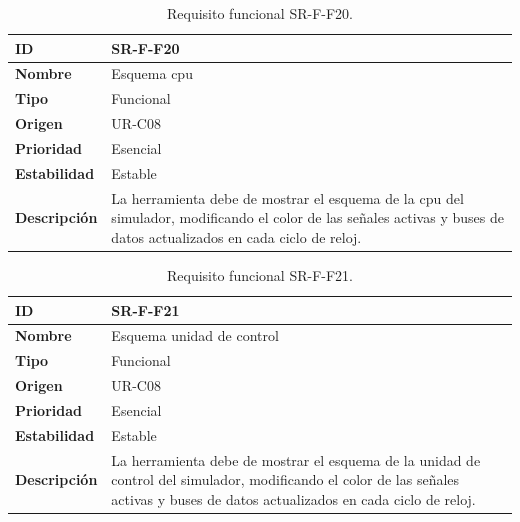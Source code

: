 \begin{center}
\begin{table}[htbp]
\centering
\caption{Requisito funcional SR-F-F20.}
\begin{tabular}{@{}p{2.5cm} p{9cm}@{}} 
\toprule
\textbf{ID} 				& SR-F-F20 \\
\midrule
\textbf{Nombre} 			& Esquema \acrshort{cpu}\\
\midrule
\textbf{Tipo} 			& Funcional \\
\midrule
\textbf{Origen} 			& UR-C08 \\
\midrule
\textbf{Prioridad}		& Esencial \\
\midrule
\textbf{Estabilidad} 		& Estable \\
\midrule
\textbf{Descripción} 	& La herramienta debe de mostrar el esquema de la \acrshort{cpu} del simulador, modificando el color de las señales activas y buses de datos actualizados en cada ciclo de reloj. \\
\bottomrule
\end{tabular}
\label{tab:srff20}
\end{table}
\end{center}

\begin{center}
\begin{table}[htbp]
\centering
\caption{Requisito funcional SR-F-F21.}
\begin{tabular}{@{}p{2.5cm} p{9cm}@{}} 
\toprule
\textbf{ID} 				& SR-F-F21 \\
\midrule
\textbf{Nombre} 			& Esquema unidad de control\\
\midrule
\textbf{Tipo} 			& Funcional \\
\midrule
\textbf{Origen} 			& UR-C08 \\
\midrule
\textbf{Prioridad}		& Esencial \\
\midrule
\textbf{Estabilidad} 		& Estable \\
\midrule
\textbf{Descripción} 	& La herramienta debe de mostrar el esquema de la unidad de control del simulador, modificando el color de las señales activas y buses de datos actualizados en cada ciclo de reloj. \\
\bottomrule
\end{tabular}
\label{tab:srff21}
\end{table}
\end{center}

